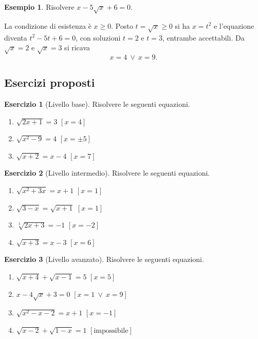 \documentclass[12pt,a4paper,openany]{book}
\theoremstyle{definition}
\newtheorem{esempio}{Esempio}[section]
\newtheorem{esercizio}{Esercizio}[section]
\theoremstyle{plain}
\theoremstyle{remark}
\begin{document}
\begin{esempio}
Risolvere $x-5\sqrt{x}+6=0$.

La condizione di esistenza è $x\ge 0$. Posto $t=\sqrt{x}\ge 0$ si ha $x=t^2$ e l'equazione diventa $t^2-5t+6=0$, con soluzioni $t=2$ e $t=3$, entrambe accettabili. Da $\sqrt{x}=2$ e $\sqrt{x}=3$ si ricava
\[
x=4\ \lor\ x=9.
\]
\end{esempio}

\subsection*{Esercizi proposti}

\begin{esercizio}[Livello base]
Risolvere le seguenti equazioni.
\begin{enumerate}[label=\alph*)]
\item $\sqrt{2x+1}=3$ \hfill $[x=4]$
\item $\sqrt{x^2-9}=4$ \hfill $[x=\pm 5]$
\item $\sqrt{x+2}=x-4$ \hfill $[x=7]$
\end{enumerate}
\end{esercizio}

\begin{esercizio}[Livello intermedio]
Risolvere le seguenti equazioni.
\begin{enumerate}[label=\alph*)]
\item $\sqrt{x^2+3x}=x+1$ \hfill $[x=1]$
\item $\sqrt{3-x}=\sqrt{x+1}$ \hfill $[x=1]$
\item $\sqrt[3]{2x+3}=-1$ \hfill $[x=-2]$
\item $\sqrt{x+3}=x-3$ \hfill $[x=6]$
\end{enumerate}
\end{esercizio}

\begin{esercizio}[Livello avanzato]
Risolvere le seguenti equazioni.
\begin{enumerate}[label=\alph*)]
\item $\sqrt{x+4}+\sqrt{x-1}=5$ \hfill $[x=5]$
\item $x-4\sqrt{x}+3=0$ \hfill $[x=1\ \lor\ x=9]$
\item $\sqrt{x^2-x-2}=x+1$ \hfill $[x=-1]$
\item $\sqrt{x-2}+\sqrt{1-x}=1$ \hfill $[\text{impossibile}]$
\end{enumerate}
\end{esercizio}
\end{document}
